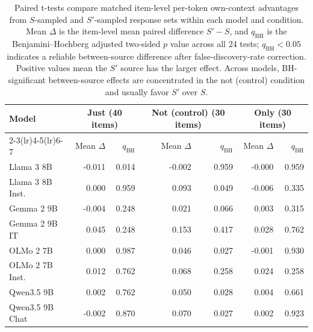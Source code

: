\begin{table}[t]
\centering
\small
\setlength{\tabcolsep}{3pt}
\caption{Paired t-tests compare matched item-level per-token own-context advantages from $S$-sampled and $S'$-sampled response sets within each model and condition. Mean $\Delta$ is the item-level mean paired difference $S' - S$, and $q_{\mathrm{BH}}$ is the Benjamini--Hochberg adjusted two-sided $p$ value across all 24 tests; $q_{\mathrm{BH}}<0.05$ indicates a reliable between-source difference after false-discovery-rate correction. Positive values mean the $S'$ source has the larger effect. Across models, BH-significant between-source effects are concentrated in the not (control) condition and usually favor $S'$ over $S$.}
\label{tab:generation-context-delta-between-source-ttests}
\begin{tabular}{lrrrrrr}
\toprule
Model & \multicolumn{2}{c}{\textbf{Just} (40 items)} & \multicolumn{2}{c}{\textbf{Not (control)} (30 items)} & \multicolumn{2}{c}{\textbf{Only} (30 items)} \\
\cmidrule(lr){2-3}\cmidrule(lr){4-5}\cmidrule(lr){6-7}
 & Mean $\Delta$ & $q_{\mathrm{BH}}$ & Mean $\Delta$ & $q_{\mathrm{BH}}$ & Mean $\Delta$ & $q_{\mathrm{BH}}$ \\
\midrule
Llama 3 8B & -0.011 & 0.014 & -0.002 & 0.959 & -0.000 & 0.959 \\
\addlinespace[2pt]
Llama 3 8B Inst. & 0.000 & 0.959 & 0.093 & 0.049 & -0.006 & 0.335 \\
\addlinespace[2pt]
Gemma 2 9B & -0.004 & 0.248 & 0.021 & 0.066 & 0.003 & 0.315 \\
\addlinespace[2pt]
Gemma 2 9B IT & 0.045 & 0.248 & 0.153 & 0.417 & 0.028 & 0.762 \\
\addlinespace[2pt]
OLMo 2 7B & 0.000 & 0.987 & 0.046 & 0.027 & -0.001 & 0.930 \\
\addlinespace[2pt]
OLMo 2 7B Inst. & 0.012 & 0.762 & 0.068 & 0.258 & 0.024 & 0.258 \\
\addlinespace[2pt]
Qwen3.5 9B & 0.002 & 0.762 & 0.050 & 0.028 & 0.004 & 0.661 \\
\addlinespace[2pt]
Qwen3.5 9B Chat & -0.002 & 0.870 & 0.070 & 0.027 & 0.002 & 0.923 \\
\bottomrule
\end{tabular}
\end{table}
